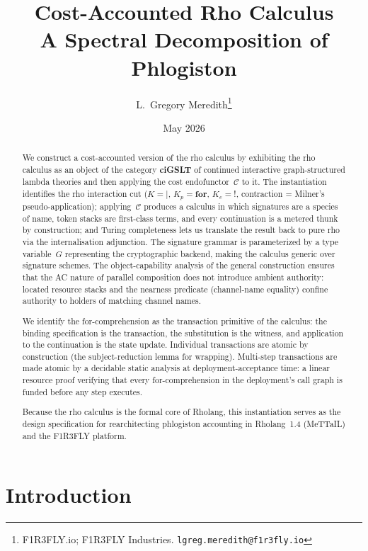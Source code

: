 \documentclass[11pt,a4paper]{article}
\title{%
  \textbf{Cost-Accounted Rho Calculus}\\[6pt]
  \large A Spectral Decomposition of Phlogiston}
\author{%
  L.\ Gregory Meredith\thanks{F1R3FLY.io; F1R3FLY Industries.
  \texttt{lgreg.meredith@f1r3fly.io}}%
}
\date{May 2026}
\begin{document}
\maketitle

\begin{abstract}
We construct a cost-accounted version of the rho calculus by
exhibiting the rho calculus as an object of the category
\textbf{ciGSLT} of continued interactive graph-structured
lambda theories and then applying the cost
endofunctor~$\mathcal{C}$ to it.  The instantiation identifies
the rho interaction cut ($K = |$, $K_p = \mathbf{for}$,
$K_e = {!}$, contraction = Milner's pseudo-application);
applying~$\mathcal{C}$ produces a calculus in which signatures
are a species of name, token stacks are first-class terms, and
every continuation is a metered thunk by construction; and
Turing completeness lets us translate the result back to pure
rho via the internalisation adjunction.  The signature grammar
is parameterized by a type variable~$G$ representing the
cryptographic backend, making the calculus generic over
signature schemes.  The object-capability analysis of the
general construction ensures that the AC nature of parallel
composition does not introduce ambient authority: located
resource stacks and the nearness predicate (channel-name
equality) confine authority to holders of matching channel
names.

We identify the for-comprehension as the transaction primitive
of the calculus: the binding specification is the transaction,
the substitution is the witness, and application to the
continuation is the state update.  Individual transactions are
atomic by construction (the subject-reduction lemma for
wrapping).  Multi-step transactions are made atomic by a
decidable static analysis at deployment-acceptance time: a
linear resource proof verifying that every for-comprehension in
the deployment's call graph is funded before any step executes.

Because the rho calculus is the formal core of Rholang, this
instantiation serves as the design specification for
rearchitecting phlogiston accounting in Rholang~1.4 (MeTTaIL)
and the F1R3FLY platform.
\end{abstract}

\tableofcontents
\bigskip

\section{Introduction}
\label{sec:intro}
\end{document}
